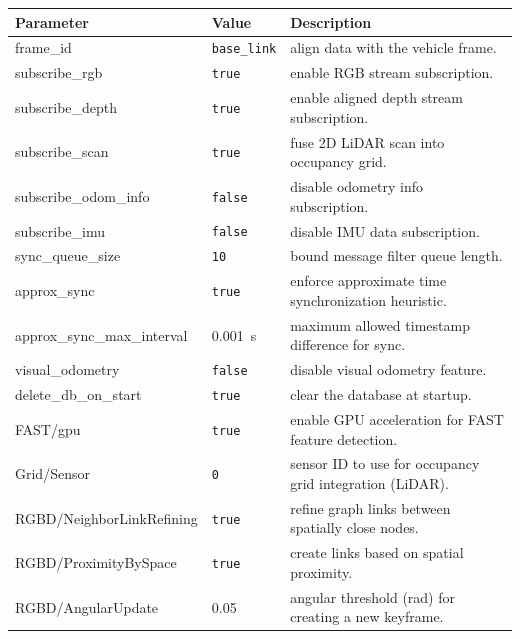 \begin{longtable}{@{}llp{}@{}}
  \toprule
  \textbf{Parameter} & \textbf{Value} & \textbf{Description} \\
  \midrule
  \endhead
  frame\_id                      & \texttt{base\_link}  & align data with the vehicle frame. \\[-4pt]
  subscribe\_rgb                 & \texttt{true}        & enable RGB stream subscription. \\[-4pt]
  subscribe\_depth               & \texttt{true}        & enable aligned depth stream subscription. \\[-4pt]
  subscribe\_scan                & \texttt{true}        & fuse 2D LiDAR scan into occupancy grid. \\[-4pt]
  subscribe\_odom\_info          & \texttt{false}       & disable odometry info subscription. \\[-4pt]
  subscribe\_imu                 & \texttt{false}       & disable IMU data subscription. \\[-4pt]
  sync\_queue\_size              & \texttt{10}          & bound message filter queue length. \\[-4pt]
  approx\_sync                   & \texttt{true}        & enforce approximate time synchronization heuristic. \\[-4pt]
  approx\_sync\_max\_interval    & \SI{0.001}{s}        & maximum allowed timestamp difference for sync. \\[-4pt]
  visual\_odometry               & \texttt{false}       & disable visual odometry feature. \\[-4pt]
  delete\_db\_on\_start          & \texttt{true}        & clear the database at startup. \\[-4pt]
  FAST/gpu                       & \texttt{true}        & enable GPU acceleration for FAST feature detection. \\[-4pt]
  Grid/Sensor                    & \texttt{0}           & sensor ID to use for occupancy grid integration (LiDAR). \\[-4pt]
  RGBD/NeighborLinkRefining      & \texttt{true}        & refine graph links between spatially close nodes. \\[-4pt]
  RGBD/ProximityBySpace          & \texttt{true}        & create links based on spatial proximity. \\[-4pt]
  RGBD/AngularUpdate             & \num{0.05}           & angular threshold (rad) for creating a new keyframe. \\[-4pt]

\end{longtable}

